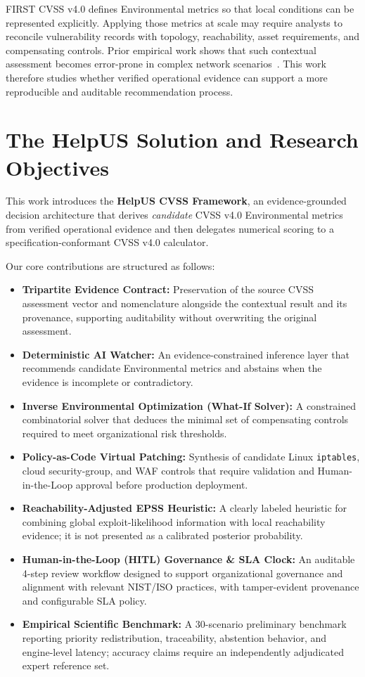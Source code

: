 FIRST CVSS v4.0 defines Environmental metrics so that local conditions can be represented explicitly. Applying those metrics at scale may require analysts to reconcile vulnerability records with topology, reachability, asset requirements, and compensating controls. Prior empirical work shows that such contextual assessment becomes error-prone in complex network scenarios~\cite{santos2017estimating}. This work therefore studies whether verified operational evidence can support a more reproducible and auditable recommendation process.

\section{The HelpUS Solution and Research Objectives}
This work introduces the \textbf{HelpUS CVSS Framework}, an evidence-grounded decision architecture that derives \emph{candidate} CVSS v4.0 Environmental metrics from verified operational evidence and then delegates numerical scoring to a specification-conformant CVSS v4.0 calculator. 

Our core contributions are structured as follows:
\begin{itemize}
    \item \textbf{Tripartite Evidence Contract:} Preservation of the source CVSS assessment vector and nomenclature alongside the contextual result and its provenance, supporting auditability without overwriting the original assessment.
    \item \textbf{Deterministic AI Watcher:} An evidence-constrained inference layer that recommends candidate Environmental metrics and abstains when the evidence is incomplete or contradictory.
    \item \textbf{Inverse Environmental Optimization (What-If Solver):} A constrained combinatorial solver that deduces the minimal set of compensating controls required to meet organizational risk thresholds.
    \item \textbf{Policy-as-Code Virtual Patching:} Synthesis of candidate Linux \texttt{iptables}, cloud security-group, and WAF controls that require validation and Human-in-the-Loop approval before production deployment.
    \item \textbf{Reachability-Adjusted EPSS Heuristic:} A clearly labeled heuristic for combining global exploit-likelihood information with local reachability evidence; it is not presented as a calibrated posterior probability.
    \item \textbf{Human-in-the-Loop (HITL) Governance \& SLA Clock:} An auditable 4-step review workflow designed to support organizational governance and alignment with relevant NIST/ISO practices, with tamper-evident provenance and configurable SLA policy.
    \item \textbf{Empirical Scientific Benchmark:} A 30-scenario preliminary benchmark reporting priority redistribution, traceability, abstention behavior, and engine-level latency; accuracy claims require an independently adjudicated expert reference set.
\end{itemize}
